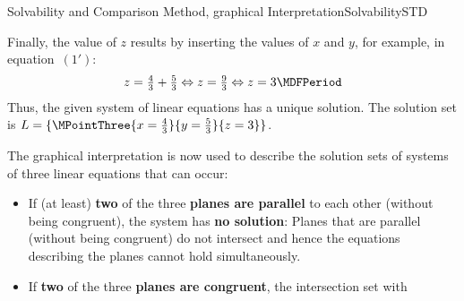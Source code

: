 \begin{MXContent}{Solvability and Comparison Method, graphical Interpretation}{Solvability}{STD}
\begin{MExample}
\begin{center}
%
\end{center}
Finally, the value of $z$ results by inserting the values of $x$ and $y$, for example, 
in equation~$(1')$:
$$z = \Mtfrac43 + \Mtfrac53 \Leftrightarrow z = \Mtfrac93 \Leftrightarrow z = 3 \MDFPeriod $$
Thus, the given system of linear equations has a unique solution. The solution set is
${\ML} = \{ \MPointThree{x = \Mtfrac43}{y = \Mtfrac53}{z = 3} \}$.
\end{MExample}
The graphical interpretation is now used to describe the solution sets of systems of three linear 
equations that can occur: 
\begin{itemize}
\item{If (at least) \textbf{two} of the three \textbf{planes are parallel} to each other 
(without being congruent), the system has \textbf{no solution}: Planes that are parallel 
(without being congruent) do not intersect and hence the equations describing the planes 
cannot hold simultaneously.}
\item{If \textbf{two} of the three \textbf{planes are congruent}, the intersection set with
}
\end{itemize}
\end{MXContent}
